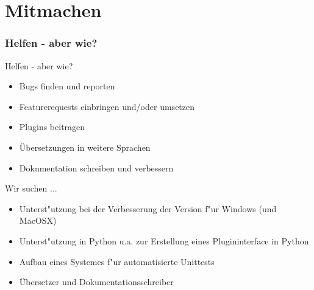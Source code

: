 \documentclass[compress]{beamer}
\begin{document}


\section{Mitmachen}
\begin{frame}
	\frametitle{Helfen - aber wie?}
	\begin{block}{Helfen - aber wie?}
		\begin{itemize}
			\item Bugs finden und reporten
			\item Featurerequests einbringen und/oder umsetzen
			\item Plugins beitragen
			\item Übersetzungen in weitere Sprachen
			\item Dokumentation schreiben und verbessern
		\end{itemize}
	\end{block}
	\pause
	\begin{block}{Wir suchen ... }
		\begin{itemize}
			\item Unterst"utzung bei der Verbesserung der Version f"ur
				  Windows (und MacOSX)
			\pause
			\item Unterst"utzung in Python u.a. zur Erstellung eines
				  Plugininterface in Python
			\pause
			\item Aufbau eines Systemes f"ur automatisierte Unittests
			\pause
			\item Übersetzer und Dokumentationsschreiber
			\pause
		\end{itemize}
	\end{block}
\end{frame}
\end{document}
